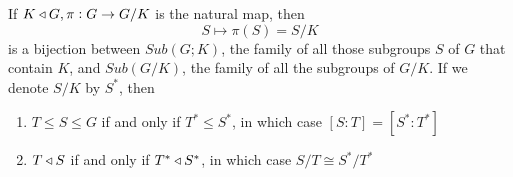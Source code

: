 \documentclass[11pt]{article}
\begin{document}
\begin{theorem}
If \(K\triangleleft G, \pi:G\to G/K\) is the natural map, then
\begin{equation*}
S\mapsto \pi(S)=S/K
\end{equation*}
is a bijection between \(Sub(G;K)\), the family of all those subgroups \(S\) of
\(G\) that contain \(K\), and \(Sub(G/K)\), the family of all the subgroups of
\(G/K\). If we denote \(S/K\) by \(S^*\), then
\begin{enumerate}
\item \(T\le S\le G\) if and only if \(T^*\le S^*\), in which case \([S:T]=[S^*:T^*]\)
\item \(T\triangleleft S\) if and only if \(T^*\triangleleft S^*\), in which case \(S/T\cong S^*/T^*\)
\end{enumerate}
\end{theorem}

\begin{center}
\end{center}
\end{document}
